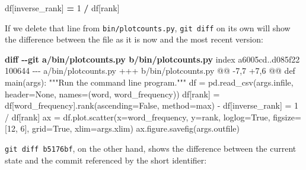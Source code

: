 \documentclass[
]{krantz}
\makeatletter
\newenvironment{Shaded}{\begin{snugshade}}{\end{snugshade}}
\newcommand{\DataTypeTok}[1]{\textcolor[rgb]{0.13,0.29,0.53}{#1}}
\newcommand{\DecValTok}[1]{\textcolor[rgb]{0.00,0.00,0.81}{#1}}
\newcommand{\KeywordTok}[1]{\textcolor[rgb]{0.13,0.29,0.53}{\textbf{#1}}}
\newcommand{\NormalTok}[1]{#1}
\newcommand{\OperatorTok}[1]{\textcolor[rgb]{0.81,0.36,0.00}{\textbf{#1}}}
\newcommand{\StringTok}[1]{\textcolor[rgb]{0.31,0.60,0.02}{#1}}
\newenvironment{kframe}{%
\medskip{}
\setlength{\fboxsep}{.8em}
 \def\at@end@of@kframe{}%
 \ifinner\ifhmode%
  \def\at@end@of@kframe{\end{minipage}}%
  \begin{minipage}{\columnwidth}%
 \fi\fi%
 \def\FrameCommand##1{\hskip\@totalleftmargin \hskip-\fboxsep
 \colorbox{shadecolor}{##1}\hskip-\fboxsep
     \hskip-\linewidth \hskip-\@totalleftmargin \hskip\columnwidth}%
 \MakeFramed {\advance\hsize-\width
   \@totalleftmargin\z@ \linewidth\hsize
   \@setminipage}}%
 {\par\unskip\endMakeFramed%
 \at@end@of@kframe}
\renewenvironment{Shaded}{\begin{kframe}}{\end{kframe}}
\makeatother
\begin{document}
\begin{Shaded}
\begin{Highlighting}[]
\NormalTok{df[}\StringTok{\textquotesingle{}inverse\_rank\textquotesingle{}}\NormalTok{] }\OperatorTok{=} \DecValTok{1} \OperatorTok{/}\NormalTok{ df[}\StringTok{\textquotesingle{}rank\textquotesingle{}}\NormalTok{]}
\end{Highlighting}
\end{Shaded}

If we delete that line from \texttt{bin/plotcounts.py},
\texttt{git\ diff} on its own will show
the difference between the file as it is now and the most recent version:

\begin{Shaded}
\begin{Highlighting}[]
\KeywordTok{diff {-}{-}git a/bin/plotcounts.py b/bin/plotcounts.py}
\NormalTok{index a6005cd..d085f22 100644}
\DataTypeTok{{-}{-}{-} a/bin/plotcounts.py}
\DataTypeTok{+++ b/bin/plotcounts.py}
\DataTypeTok{@@ {-}7,7 +7,6 @@ def main(args):}
\NormalTok{     """Run the command line program."""}
\NormalTok{     df = pd.read\_csv(args.infile, header=None, names=(\textquotesingle{}word\textquotesingle{}, \textquotesingle{}word\_frequency\textquotesingle{}))}
\NormalTok{     df[\textquotesingle{}rank\textquotesingle{}] = df[\textquotesingle{}word\_frequency\textquotesingle{}].rank(ascending=False, method=\textquotesingle{}max\textquotesingle{})}
\StringTok{{-}    df[\textquotesingle{}inverse\_rank\textquotesingle{}] = 1 / df[\textquotesingle{}rank\textquotesingle{}]}
\NormalTok{     ax = df.plot.scatter(x=\textquotesingle{}word\_frequency\textquotesingle{}, y=\textquotesingle{}rank\textquotesingle{}, loglog=True,}
\NormalTok{                         figsize=[12, 6], grid=True, xlim=args.xlim)}
\NormalTok{     ax.figure.savefig(args.outfile)}
\end{Highlighting}
\end{Shaded}

\texttt{git\ diff\ b5176bf},
on the other hand,
shows the difference between the current state
and the commit referenced by the short identifier:
\end{document}
